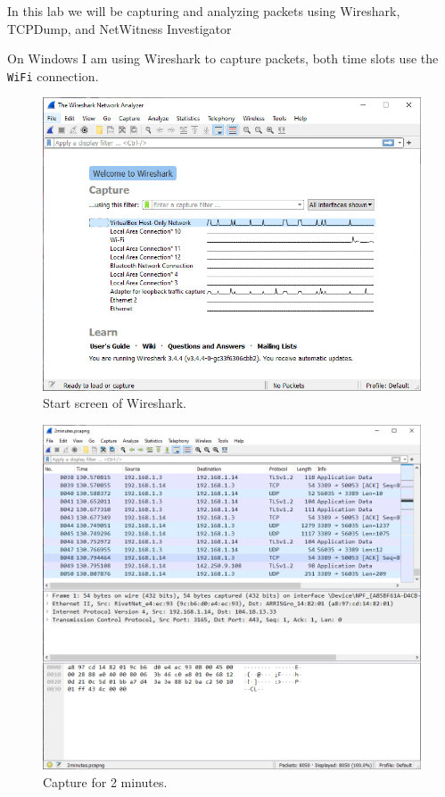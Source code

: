 In this lab we will be capturing and analyzing packets using Wireshark, TCPDump, and NetWitness Investigator

On Windows I am using Wireshark to capture packets, both time slots use the \verb|WiFi| connection.
\begin{figure}[H]
    \centering
    \includegraphics[width=\linewidth]{figures/wireshark_start.png}
    \caption{Start screen of Wireshark.}
\end{figure}

\begin{figure}[H]
    \centering
    \includegraphics[width=\linewidth]{figures/2minutes_wireshark.png}
    \caption{Capture for 2 minutes.}
    \label{fig:2min}
\end{figure}

